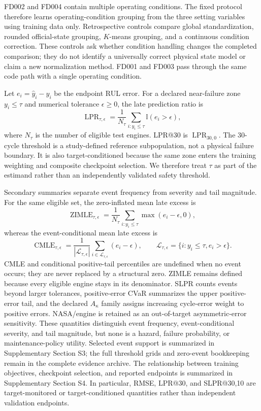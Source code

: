 \documentclass[preprint,12pt,numbers,sort&compress]{elsarticle}
\begin{document}
FD002 and FD004 contain multiple operating conditions. The fixed protocol therefore learns operating-condition grouping from the three setting variables using training data only. Retrospective controls compare global standardization, rounded official-state grouping, $K$-means grouping, and a continuous condition correction. These controls ask whether condition handling changes the completed comparison; they do not identify a universally correct physical state model or claim a new normalization method. FD001 and FD003 pass through the same code path with a single operating condition.

Let $e_i=\hat y_i-y_i$ be the endpoint RUL error. For a declared near-failure zone $y_i\leq\tau$ and numerical tolerance $\epsilon\geq0$, the late prediction ratio is
\begin{equation}
\operatorname{LPR}_{\tau,\epsilon}=\frac{1}{N_\tau}\sum_{i:y_i\leq\tau}\mathbb{I}(e_i>\epsilon),
\label{eq:lpr}
\end{equation}
where $N_\tau$ is the number of eligible test engines. LPR@30 is $\operatorname{LPR}_{30,0}$. The 30-cycle threshold is a study-defined reference subpopulation, not a physical failure boundary. It is also target-conditioned because the same zone enters the training weighting and composite checkpoint selection. We therefore treat $\tau$ as part of the estimand rather than an independently validated safety threshold.

Secondary summaries separate event frequency from severity and tail magnitude. For the same eligible set, the zero-inflated mean late excess is
\begin{equation}
\operatorname{ZIMLE}_{\tau,\epsilon}=\frac{1}{N_\tau}\sum_{i:y_i\leq\tau}\max(e_i-\epsilon,0),
\end{equation}
whereas the event-conditional mean late excess is
\begin{equation}
\operatorname{CMLE}_{\tau,\epsilon}=\frac{1}{|\mathcal L_{\tau,\epsilon}|}\sum_{i\in\mathcal L_{\tau,\epsilon}}(e_i-\epsilon),\qquad
\mathcal L_{\tau,\epsilon}=\{i:y_i\leq\tau,e_i>\epsilon\}.
\end{equation}
CMLE and conditional positive-tail percentiles are undefined when no event occurs; they are never replaced by a structural zero. ZIMLE remains defined because every eligible engine stays in its denominator. SLPR counts events beyond larger tolerances, positive-error CVaR summarizes the upper positive-error tail, and the declared $A_\kappa$ family assigns increasing cycle-error weight to positive errors. NASA/engine is retained as an out-of-target asymmetric-error sensitivity. These quantities distinguish event frequency, event-conditional severity, and tail magnitude, but none is a hazard, failure probability, or maintenance-policy utility. Selected event support is summarized in Supplementary Section S3; the full threshold grids and zero-event bookkeeping remain in the complete evidence archive. The relationship between training objectives, checkpoint selection, and reported endpoints is summarized in Supplementary Section S4. In particular, RMSE, LPR@30, and SLPR@30,10 are target-monitored or target-conditioned quantities rather than independent validation endpoints.
\end{document}

